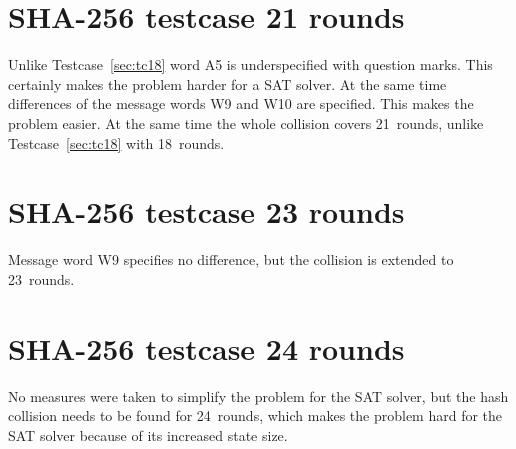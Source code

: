 \begin{appendices}
\section{SHA-256 testcase 21 rounds}
\label{sec:tc21}
Unlike Testcase~\ref{sec:tc18} word A5 is underspecified with question marks.
This certainly makes the problem harder for a SAT solver.
At the same time differences of the message words W9 and W10 are specified.
This makes the problem easier. At the same time the whole collision covers
21~rounds, unlike Testcase~\ref{sec:tc18} with 18~rounds.

\section{SHA-256 testcase 23 rounds}
\label{sec:tc23}
Message word W9 specifies no difference, but the collision is extended
to 23~rounds.

\section{SHA-256 testcase 24 rounds}
\label{sec:tc24}
No measures were taken to simplify the problem for the SAT solver,
but the hash collision needs to be found for 24~rounds, which
makes the problem hard for the SAT solver because of its increased
state size.





\end{appendices}
